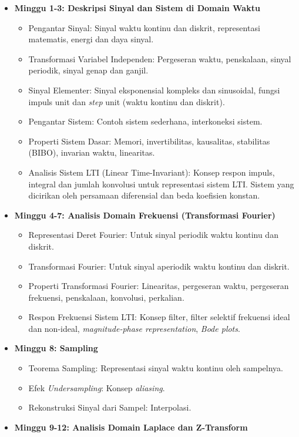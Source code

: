 \documentclass[
  letterpaper,
  DIV=11,
  numbers=noendperiod]{scrreprt}
\providecommand{\tightlist}{%
  \setlength{\itemsep}{0pt}\setlength{\parskip}{0pt}}
\begin{document}
\begin{itemize}
\item
  \textbf{Minggu 1-3: Deskripsi Sinyal dan Sistem di Domain Waktu}

  \begin{itemize}
  \tightlist
  \item
    Pengantar Sinyal: Sinyal waktu kontinu dan diskrit, representasi
    matematis, energi dan daya sinyal.
  \item
    Transformasi Variabel Independen: Pergeseran waktu, penskalaan,
    sinyal periodik, sinyal genap dan ganjil.
  \item
    Sinyal Elementer: Sinyal eksponensial kompleks dan sinusoidal,
    fungsi impuls unit dan \emph{step} unit (waktu kontinu dan diskrit).
  \item
    Pengantar Sistem: Contoh sistem sederhana, interkoneksi sistem.
  \item
    Properti Sistem Dasar: Memori, invertibilitas, kausalitas,
    stabilitas (BIBO), invarian waktu, linearitas.
  \item
    Analisis Sistem LTI (Linear Time-Invariant): Konsep respon impuls,
    integral dan jumlah konvolusi untuk representasi sistem LTI. Sistem
    yang dicirikan oleh persamaan diferensial dan beda koefisien
    konstan.
  \end{itemize}
\item
  \textbf{Minggu 4-7: Analisis Domain Frekuensi (Transformasi Fourier)}

  \begin{itemize}
  \tightlist
  \item
    Representasi Deret Fourier: Untuk sinyal periodik waktu kontinu dan
    diskrit.
  \item
    Transformasi Fourier: Untuk sinyal aperiodik waktu kontinu dan
    diskrit.
  \item
    Properti Transformasi Fourier: Linearitas, pergeseran waktu,
    pergeseran frekuensi, penskalaan, konvolusi, perkalian.
  \item
    Respon Frekuensi Sistem LTI: Konsep filter, filter selektif
    frekuensi ideal dan non-ideal, \emph{magnitude-phase
    representation}, \emph{Bode plots}.
  \end{itemize}
\item
  \textbf{Minggu 8: Sampling}

  \begin{itemize}
  \tightlist
  \item
    Teorema Sampling: Representasi sinyal waktu kontinu oleh sampelnya.
  \item
    Efek \emph{Undersampling}: Konsep \emph{aliasing}.
  \item
    Rekonstruksi Sinyal dari Sampel: Interpolasi.
  \end{itemize}
\item
  \textbf{Minggu 9-12: Analisis Domain Laplace dan Z-Transform}


\end{itemize}
\end{document}
